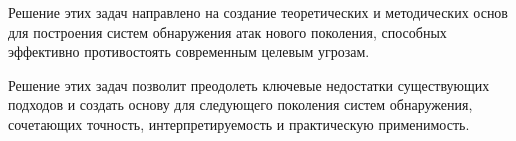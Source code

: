 \documentclass{article}
\begin{document}
Решение этих задач направлено на создание теоретических и методических основ для построения систем обнаружения атак нового поколения, способных эффективно противостоять современным целевым угрозам.

Решение этих задач позволит преодолеть ключевые недостатки существующих подходов и создать основу для следующего поколения систем обнаружения, сочетающих точность, интерпретируемость и практическую применимость.

\end{document}

